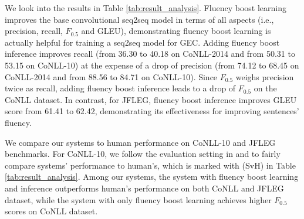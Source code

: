 \documentclass{article} %
\begin{document}
We look into the results in Table \ref{tab:result_analysis}. Fluency boost learning improves the base convolutional seq2seq model in terms of all aspects (i.e., precision, recall, $F_{0.5}$ and GLEU), demonstrating fluency boost learning is actually helpful for training a seq2seq model for GEC. Adding fluency boost inference improves recall (from 36.30 to 40.18 on CoNLL-2014 and from 50.31 to 53.15 on CoNLL-10) at the expense of a drop of precision (from 74.12 to 68.45 on CoNLL-2014 and from 88.56 to 84.71 on CoNLL-10). Since $F_{0.5}$ weighs precision twice as recall, adding fluency boost inference leads to a drop of $F_{0.5}$ on the CoNLL dataset. In contrast, for JFLEG, fluency boost inference improves GLEU score from 61.41 to 62.42, demonstrating its effectiveness for improving sentences' fluency.

We compare our systems to human performance on CoNLL-10 and JFLEG benchmarks. For CoNLL-10, we follow the evaluation setting in \cite{bryant2015far} and \cite{chollampatt-ng:2017:BEA} to fairly compare systems' performance to human's, which is marked with (SvH) in Table \ref{tab:result_analysis}. Among our systems, the system with fluency boost learning and inference outperforms human's performance on both CoNLL and JFLEG dataset, while the system with only fluency boost learning achieves higher $F_{0.5}$ scores on CoNLL dataset.
\end{document}
